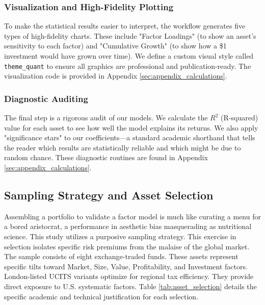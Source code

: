 \documentclass[12pt]{article}
\begin{document}
\subsubsection{Visualization and High-Fidelity Plotting}
To make the statistical results easier to interpret, the workflow generates five types of high-fidelity charts. These include "Factor Loadings" (to show an asset's sensitivity to each factor) and "Cumulative Growth" (to show how a \$1 investment would have grown over time). We define a custom visual style called \texttt{theme\_quant} to ensure all graphics are professional and publication-ready. The visualization code is provided in Appendix \ref{sec:appendix_calculations}.

\subsubsection{Diagnostic Auditing}
The final step is a rigorous audit of our models. We calculate the $R^2$ (R-squared) value for each asset to see how well the model explains its returns. We also apply "significance stars" to our coefficients---a standard academic shorthand that tells the reader which results are statistically reliable and which might be due to random chance. These diagnostic routines are found in Appendix \ref{sec:appendix_calculations}.

\subsection{Sampling Strategy and Asset Selection}
Assembling a portfolio to validate a factor model is much like curating a menu for a bored aristocrat, a performance in aesthetic bias masquerading as nutritional science. This study utilizes a purposive sampling strategy. This exercise in selection isolates specific risk premiums from the malaise of the global market. The sample consists of eight exchange-traded funds. These assets represent specific tilts toward Market, Size, Value, Profitability, and Investment factors. London-listed UCITS variants optimize for regional tax efficiency. They provide direct exposure to U.S. systematic factors. Table \ref{tab:asset_selection} details the specific academic and technical justification for each selection.
\end{document}
